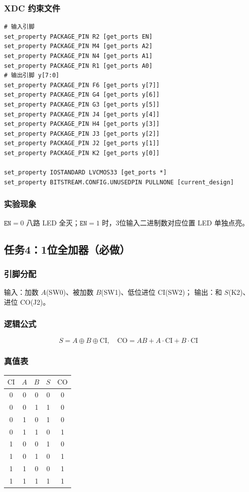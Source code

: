 \documentclass[11pt,a4paper]{article}
\begin{document}
\subsubsection{XDC 约束文件}
\begin{lstlisting}
# 输入引脚
set_property PACKAGE_PIN R2 [get_ports EN]
set_property PACKAGE_PIN M4 [get_ports A2]
set_property PACKAGE_PIN N4 [get_ports A1]
set_property PACKAGE_PIN R1 [get_ports A0]
# 输出引脚 y[7:0]
set_property PACKAGE_PIN F6 [get_ports y[7]]
set_property PACKAGE_PIN G4 [get_ports y[6]]
set_property PACKAGE_PIN G3 [get_ports y[5]]
set_property PACKAGE_PIN J4 [get_ports y[4]]
set_property PACKAGE_PIN H4 [get_ports y[3]]
set_property PACKAGE_PIN J3 [get_ports y[2]]
set_property PACKAGE_PIN J2 [get_ports y[1]]
set_property PACKAGE_PIN K2 [get_ports y[0]]

set_property IOSTANDARD LVCMOS33 [get_ports *]
set_property BITSTREAM.CONFIG.UNUSEDPIN PULLNONE [current_design]
\end{lstlisting}

\subsubsection{实验现象}
$\texttt{EN}=0$ 八路 LED 全灭；$\texttt{EN}=1$ 时，3位输入二进制数对应位置 LED 单独点亮。

\newpage
\subsection{任务4：1位全加器（必做）}
\subsubsection{引脚分配}
输入：加数 $A$(SW0)、被加数 $B$(SW1)、低位进位 $\text{CI}$(SW2)；
输出：和 $S$(K2)、进位 $\text{CO}$(J2)。

\subsubsection{逻辑公式}
\[
S = A \oplus B \oplus \text{CI},\quad \text{CO} = AB + A\cdot \text{CI} + B\cdot \text{CI}
\]

\subsubsection{真值表}
\begin{table}[htbp]
\centering
\begin{tabular}{ccccc}
\toprule
$\text{CI}$ & $A$ & $B$ & $S$ & $\text{CO}$ \\
\midrule
0  & 0 & 0 & 0 & 0 \\
0  & 0 & 1 & 1 & 0 \\
0  & 1 & 0 & 1 & 0 \\
0  & 1 & 1 & 0 & 1 \\
1  & 0 & 0 & 1 & 0 \\
1  & 0 & 1 & 0 & 1 \\
1  & 1 & 0 & 0 & 1 \\
1  & 1 & 1 & 1 & 1 \\
\bottomrule
\end{tabular}
\end{table}
\end{document}
